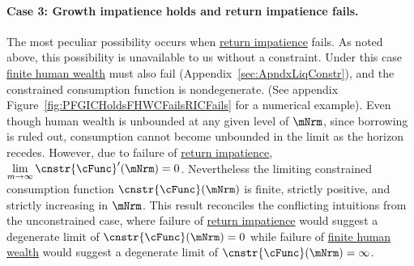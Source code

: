 \documentclass[BufferStockTheory]{subfiles}
\begin{document}
\hypertarget{RICandFHWCFail}{}
\paragraph{Case 3: Growth impatience holds and return impatience fails.} The most peculiar possibility occurs when   \hyperlink{RIC}{return impatience} fails. As noted above, this possibility is unavailable to us without a constraint. Under this case \hyperlink{FHWC}{finite human wealth} must also fail (Appendix~\ref{sec:ApndxLiqConstr}), and the constrained consumption function is nondegenerate.  (See appendix Figure~\ref{fig:PFGICHoldsFHWCFailsRICFails} for a numerical example). Even though human wealth is unbounded at any given level of $\mNrm$, since borrowing is ruled out, consumption cannot become unbounded in the limit as the horizon recedes. However, due to failure of \hyperlink{RIC}{return impatience},  $\lim\limits_{m \rightarrow \infty} \cnstr{\cFunc}^{\prime}(\mNrm) = 0$. Nevertheless the limiting constrained consumption function $\cnstr{\cFunc}(\mNrm)$ is finite, strictly positive, and strictly increasing in $\mNrm$.  This result reconciles the conflicting intuitions from the unconstrained case, where failure of \hyperlink{RIC}{return impatience} would suggest a degenerate limit of $\cnstr{\cFunc}(\mNrm)=0$ while failure of \hyperlink{FHWC}{finite human wealth} would suggest a degenerate limit of $\cnstr{\cFunc}(\mNrm)=\infty$. 

\begin{comment}
For future work (Akshay):

The consumer's patience in the continuation value remains finite, as the planning horizon recedes, the consumer will never take consumption to zero due to excessive patience.
\end{comment}




\end{document}
